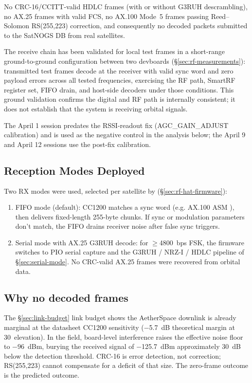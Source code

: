 No CRC-16/CCITT-valid HDLC frames (with or without G3RUH descrambling), no AX.25 frames with valid FCS, no AX.100 Mode~5 frames passing Reed--Solomon RS(255,223) correction, and consequently no decoded packets submitted to the SatNOGS DB from real satellites.

The receive chain has been validated for local test frames in a short-range ground-to-ground configuration between two devboards (\S\ref{sec:rf-measurements}): transmitted test frames decode at the receiver with valid sync word and zero payload errors across all tested frequencies, exercising the RF path, SmartRF register set, FIFO drain, and host-side decoders under those conditions. This ground validation confirms the digital and RF path is internally consistent; it does not establish that the system is receiving orbital signals.

The April 1 session predates the RSSI-readout fix (AGC\_GAIN\_ADJUST calibration) and is used as the negative control in the analysis below; the April 9 and April 12 sessions use the post-fix calibration.

\subsection{Reception Modes Deployed}

Two RX modes were used, selected per satellite by  (\S\ref{sec:rf-hat-firmware}):

\begin{enumerate}
    \item FIFO mode (default): CC1200 matches a sync word (e.g. AX.100 ASM ), then delivers fixed-length 255-byte chunks. If sync or modulation parameters don't match, the FIFO drains receiver noise after false sync triggers.
    \item Serial mode with AX.25 G3RUH decode: for $\geq$4800~bps FSK, the firmware switches to PIO serial capture and the G3RUH / NRZ-I / HDLC pipeline of \S\ref{sec:serial-mode}. No CRC-valid AX.25 frames were recovered from orbital data.
\end{enumerate}

\subsection{Why no decoded frames}

The \S\ref{sec:link-budget} link budget shows the AetherSpace downlink is already marginal at the datasheet CC1200 sensitivity ($-$5.7~dB theoretical margin at 30\degree\ elevation). In the field, board-level interference raises the effective noise floor to $-$96~dBm, burying the received signal of $-$125.7~dBm approximately 30~dB below the detection threshold. CRC-16 is error detection, not correction; RS(255,223) cannot compensate for a deficit of that size. The zero-frame outcome is the predicted outcome.

